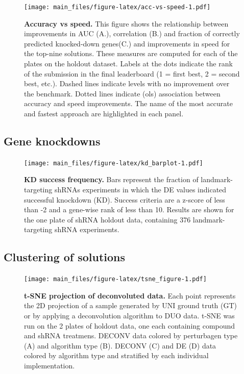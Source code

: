 \documentclass[]{article}
\begin{document}
\begin{figure}
\centering
\texttt{[image: main\_files/figure-latex/acc-vs-speed-1.pdf]}
\caption{\label{fig:acc-vs-speed}\textbf{Accuracy vs speed.} This figure
shows the relationship between improvements in AUC (A.), correlation
(B.) and fraction of correctly predicted knocked-down genes(C.) and
improvements in speed for the top-nine solutions. These measures are
computed for each of the plates on the holdout dataset. Labels at the
dots indicate the rank of the submission in the final leaderboard (1 =
first best, 2 = second best, etc.). Dashed lines indicate levels with no
improvement over the benchmark. Dotted lines indicate (ols) association
between accuracy and speed improvements. The name of the most accurate
and fastest approach are highlighted in each panel.}
\end{figure}

\hypertarget{gene-knockdowns}{%
\subsection{Gene knockdowns}\label{gene-knockdowns}}

\begin{figure}
\centering
\texttt{[image: main\_files/figure-latex/kd\_barplot-1.pdf]}
\caption{\label{kd_barplot}\textbf{KD success frequency.} Bars represent
the fraction of landmark-targeting shRNAs experiments in which the DE
values indicated successful knockdown (KD). Success criteria are a
z-score of less than -2 and a gene-wise rank of less than 10. Results
are shown for the one plate of shRNA holdout data, containing 376
landmark-targeting shRNA experiments.}
\end{figure}

\hypertarget{clustering-of-solutions}{%
\subsection{Clustering of solutions}\label{clustering-of-solutions}}

\begin{figure}
\centering
\texttt{[image: main\_files/figure-latex/tsne\_figure-1.pdf]}
\caption{\label{tsne_figure}\textbf{t-SNE projection of deconvoluted
data.} Each point represents the 2D projection of a sample generated by
UNI ground truth (GT) or by applying a deconvolution algorithm to DUO
data. t-SNE was run on the 2 plates of holdout data, one each containing
compound and shRNA treatmens. DECONV data colored by perturbagen type
(A) and algorithm type (B). DECONV (C) and DE (D) data colored by
algorithm type and stratified by each individual implementation.}
\end{figure}
\end{document}
